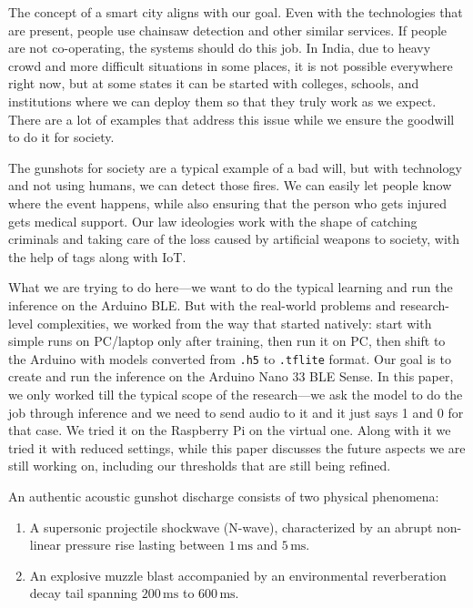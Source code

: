 \documentclass[conference]{IEEEtran}
\begin{document}
The concept of a smart city aligns with our goal. Even with the technologies that are present, people use chainsaw detection and other similar services. If people are not co-operating, the systems should do this job. In India, due to heavy crowd and more difficult situations in some places, it is not possible everywhere right now, but at some states it can be started with colleges, schools, and institutions where we can deploy them so that they truly work as we expect. There are a lot of examples that address this issue while we ensure the goodwill to do it for society.

The gunshots for society are a typical example of a bad will, but with technology and not using humans, we can detect those fires. We can easily let people know where the event happens, while also ensuring that the person who gets injured gets medical support. Our law ideologies work with the shape of catching criminals and taking care of the loss caused by artificial weapons to society, with the help of tags along with IoT.

What we are trying to do here---we want to do the typical learning and run the inference on the Arduino BLE. But with the real-world problems and research-level complexities, we worked from the way that started natively: start with simple runs on PC/laptop only after training, then run it on PC, then shift to the Arduino with models converted from \texttt{.h5} to \texttt{.tflite} format. Our goal is to create and run the inference on the Arduino Nano 33 BLE Sense. In this paper, we only worked till the typical scope of the research---we ask the model to do the job through inference and we need to send audio to it and it just says 1 and 0 for that case. We tried it on the Raspberry Pi on the virtual one. Along with it we tried it with reduced settings, while this paper discusses the future aspects we are still working on, including our thresholds that are still being refined.

An authentic acoustic gunshot discharge consists of two physical phenomena:
\begin{enumerate}
    \item A supersonic projectile shockwave (N-wave), characterized by an abrupt non-linear pressure rise lasting between $1\,\text{ms}$ and $5\,\text{ms}$.
    \item An explosive muzzle blast accompanied by an environmental reverberation decay tail spanning $200\,\text{ms}$ to $600\,\text{ms}$.
\end{enumerate}
\end{document}
